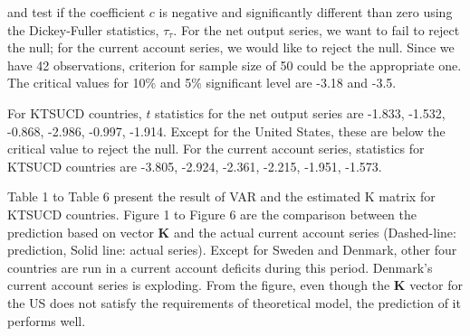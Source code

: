 \documentclass[12pt]{article}
\begin{document}
and test if the coefficient $ c $ is negative and significantly different than zero
using the Dickey-Fuller statistics, $ \tau_{\tau} $. For the net output series,
we want to fail to reject the null; for the current account series, we would like to
reject the null. Since we have 42 observations, criterion for sample size of 50 could
be the appropriate one. The critical values for 10\% and 5\% significant level are
-3.18 and -3.5.

For KTSUCD countries, $ t $ statistics for the net output series are -1.833, -1.532,
-0.868, -2.986, -0.997, -1.914. Except for the United States, these are below the 
critical value to reject the null. For the current account series, statistics for 
KTSUCD countries are -3.805, -2.924, -2.361, -2.215, -1.951, -1.573.

Table 1 to Table 6 present the result of VAR and the estimated K matrix for KTSUCD 
countries. Figure 1 to Figure 6 are the comparison between the prediction based on
vector $ \bm{K} $ and the actual current account series (Dashed-line: prediction, 
Solid line: actual series). Except for Sweden and Denmark,
other four countries are run in a current account deficits during this period. Denmark's
current account series is exploding. 
From the figure, even though the $ \bm{K} $ vector for the US does not satisfy the
requirements of theoretical model, the prediction of it performs well.
\end{document}
